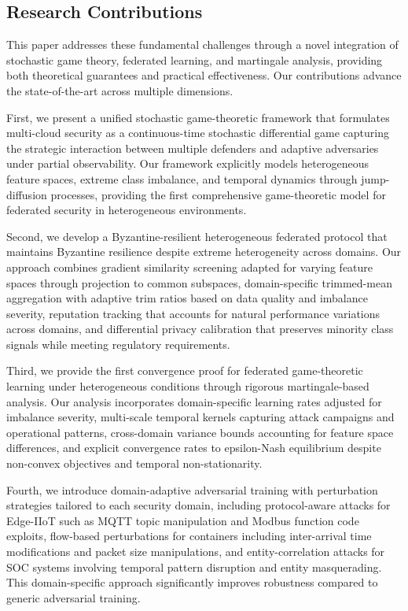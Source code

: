 \documentclass[12pt,a4paper]{article}
\theoremstyle{definition}
\begin{document}
\subsection{Research Contributions}

This paper addresses these fundamental challenges through a novel integration of stochastic game theory, federated learning, and martingale analysis, providing both theoretical guarantees and practical effectiveness. Our contributions advance the state-of-the-art across multiple dimensions.

First, we present a unified stochastic game-theoretic framework that formulates multi-cloud security as a continuous-time stochastic differential game capturing the strategic interaction between multiple defenders and adaptive adversaries under partial observability. Our framework explicitly models heterogeneous feature spaces, extreme class imbalance, and temporal dynamics through jump-diffusion processes, providing the first comprehensive game-theoretic model for federated security in heterogeneous environments.

Second, we develop a Byzantine-resilient heterogeneous federated protocol that maintains Byzantine resilience despite extreme heterogeneity across domains. Our approach combines gradient similarity screening adapted for varying feature spaces through projection to common subspaces, domain-specific trimmed-mean aggregation with adaptive trim ratios based on data quality and imbalance severity, reputation tracking that accounts for natural performance variations across domains, and differential privacy calibration that preserves minority class signals while meeting regulatory requirements.

Third, we provide the first convergence proof for federated game-theoretic learning under heterogeneous conditions through rigorous martingale-based analysis. Our analysis incorporates domain-specific learning rates adjusted for imbalance severity, multi-scale temporal kernels capturing attack campaigns and operational patterns, cross-domain variance bounds accounting for feature space differences, and explicit convergence rates to epsilon-Nash equilibrium despite non-convex objectives and temporal non-stationarity.

Fourth, we introduce domain-adaptive adversarial training with perturbation strategies tailored to each security domain, including protocol-aware attacks for Edge-IIoT such as MQTT topic manipulation and Modbus function code exploits, flow-based perturbations for containers including inter-arrival time modifications and packet size manipulations, and entity-correlation attacks for SOC systems involving temporal pattern disruption and entity masquerading. This domain-specific approach significantly improves robustness compared to generic adversarial training.
\end{document}
